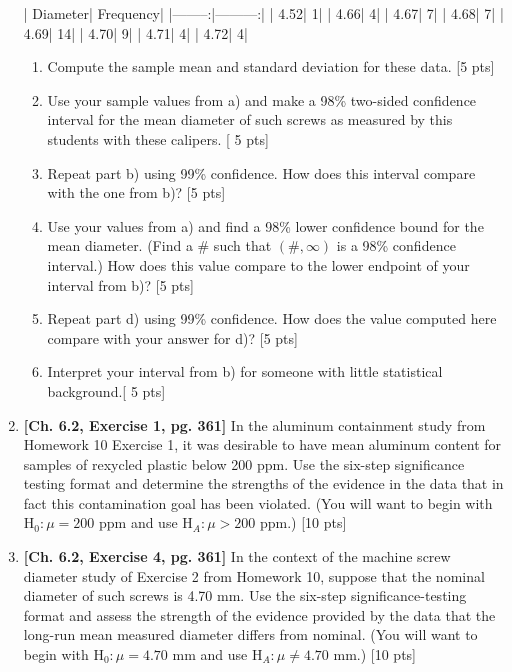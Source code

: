 \documentclass[11pt]{article}\usepackage[]{graphicx}\usepackage[]{color}
\begin{document}
\begin{enumerate}
\begin{Schunk}
\begin{Soutput}
| Diameter| Frequency|
|--------:|---------:|
|     4.52|         1|
|     4.66|         4|
|     4.67|         7|
|     4.68|         7|
|     4.69|        14|
|     4.70|         9|
|     4.71|         4|
|     4.72|         4|
\end{Soutput}
\end{Schunk}
  
      \begin{enumerate}
          \item Compute the sample mean and standard deviation for these data. [5 pts]
          \item Use your sample values from a) and make a 98\% two-sided confidence interval for the mean diameter of such screws as measured by this students with these calipers. [ 5 pts]
          \item Repeat part b) using 99\% confidence. How does this interval compare with the one from b)? [5 pts]
          \item Use your values from a) and find a 98\% lower confidence bound for the mean diameter. (Find a # such that $(\#, \infty)$ is a 98\% confidence interval.) How does this value compare to the lower endpoint of your interval from b)? [5 pts]
          \item Repeat part d) using 99\% confidence. How does the value computed here compare with your answer for d)? [5 pts]
          \item Interpret your interval from b) for someone with little statistical background.[ 5 pts]
    \end{enumerate}
    
\item\textbf {[Ch. 6.2, Exercise 1, pg. 361]} In the aluminum containment study from Homework 10 Exercise 1, it was desirable to have mean aluminum content for samples of rexycled plastic below 200 ppm. Use the six-step significance testing format and determine the strengths of the evidence in the data that in fact this contamination goal has been violated. (You will want to begin with $\text{H}_0: \mu = 200$ ppm and use $\text{H}_A: \mu > 200$ ppm.) [10 pts]

\item\textbf {[Ch. 6.2, Exercise 4, pg. 361]} In the context of the machine screw diameter study of Exercise 2 from Homework 10, suppose that the nominal diameter of such screws is 4.70 mm. Use the six-step significance-testing format and assess the strength of the evidence provided by the data that the long-run mean measured diameter differs from nominal. (You will want to begin with $\text{H}_0: \mu = 4.70$ mm and use $\text{H}_A: \mu \not= 4.70$ mm.) [10 pts]
  

\end{enumerate}
\end{document}
